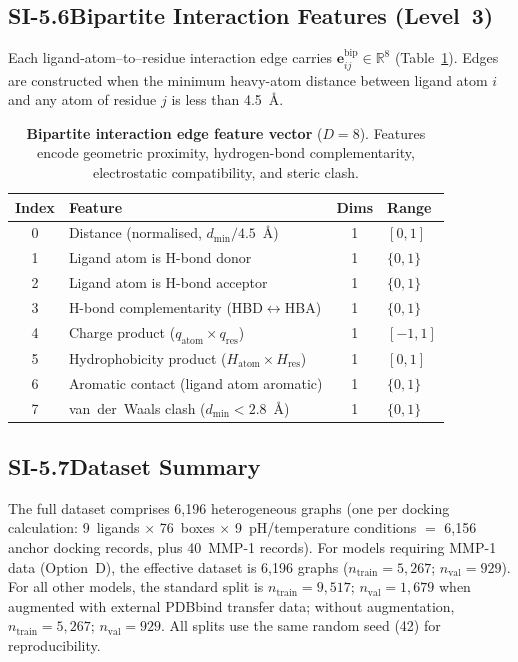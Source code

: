 \documentclass[11pt]{article}
\begin{document}
\subsection*{SI-5.6\quad Bipartite Interaction Features (Level~3)}

Each ligand-atom--to--residue interaction edge carries
$\mathbf{e}_{ij}^{\mathrm{bip}} \in \mathbb{R}^{8}$ (Table~\ref{tab:si_bip_feat}).
Edges are constructed when the minimum heavy-atom distance between
ligand atom $i$ and any atom of residue $j$ is less than 4.5~\AA.

\begin{table}[H]
\small
\centering
\caption{\textbf{Bipartite interaction edge feature vector} ($D = 8$).
  Features encode geometric proximity, hydrogen-bond complementarity,
  electrostatic compatibility, and steric clash.}
\label{tab:si_bip_feat}
\begin{tabular}{clcl}
\toprule
\textbf{Index} & \textbf{Feature} & \textbf{Dims} & \textbf{Range} \\
\midrule
0 & Distance (normalised, $d_{\min} / 4.5$~\AA) & 1 & $[0, 1]$ \\
1 & Ligand atom is H-bond donor       & 1 & $\{0, 1\}$ \\
2 & Ligand atom is H-bond acceptor    & 1 & $\{0, 1\}$ \\
3 & H-bond complementarity (HBD$\leftrightarrow$HBA) & 1 & $\{0, 1\}$ \\
4 & Charge product ($q_{\mathrm{atom}} \times q_{\mathrm{res}}$) & 1 & $[-1, 1]$ \\
5 & Hydrophobicity product ($H_{\mathrm{atom}} \times H_{\mathrm{res}}$) & 1 & $[0, 1]$ \\
6 & Aromatic contact (ligand atom aromatic) & 1 & $\{0, 1\}$ \\
7 & van~der~Waals clash ($d_{\min} < 2.8$~\AA) & 1 & $\{0, 1\}$ \\
\bottomrule
\end{tabular}
\end{table}

\subsection*{SI-5.7\quad Dataset Summary}

The full dataset comprises 6{,}196 heterogeneous graphs (one per
docking calculation: 9~ligands $\times$ 76~boxes $\times$ 9~pH/temperature
conditions $=$ 6{,}156 anchor docking records, plus 40~MMP-1 records).
For models requiring MMP-1 data (Option~D), the effective dataset is
6{,}196 graphs ($n_{\mathrm{train}} = 5{,}267$; $n_{\mathrm{val}} = 929$).
For all other models, the standard split is
$n_{\mathrm{train}} = 9{,}517$; $n_{\mathrm{val}} = 1{,}679$ when
augmented with external PDBbind transfer data; without augmentation,
$n_{\mathrm{train}} = 5{,}267$; $n_{\mathrm{val}} = 929$.
All splits use the same random seed (42) for reproducibility.
\end{document}
